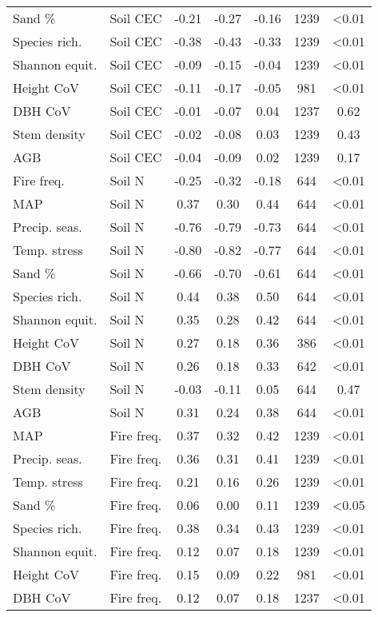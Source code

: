 \begin{longtable}{llS[table-format=-1.2]S[table-format=-1.2]S[table-format=-1.2]S[table-format=4.0]S[table-format=<1.2]}
Sand \% & Soil CEC & -0.21 & -0.27 & -0.16 & 1239 & <0.01 \\ 
Species rich. & Soil CEC & -0.38 & -0.43 & -0.33 & 1239 & <0.01 \\ 
Shannon equit. & Soil CEC & -0.09 & -0.15 & -0.04 & 1239 & <0.01 \\ 
Height CoV & Soil CEC & -0.11 & -0.17 & -0.05 & 981 & <0.01 \\ 
DBH CoV & Soil CEC & -0.01 & -0.07 & 0.04 & 1237 & 0.62 \\ 
Stem density & Soil CEC & -0.02 & -0.08 & 0.03 & 1239 & 0.43 \\ 
AGB & Soil CEC & -0.04 & -0.09 & 0.02 & 1239 & 0.17 \\ 
Fire freq. & Soil N & -0.25 & -0.32 & -0.18 & 644 & <0.01 \\ 
MAP & Soil N & 0.37 & 0.30 & 0.44 & 644 & <0.01 \\ 
Precip. seas. & Soil N & -0.76 & -0.79 & -0.73 & 644 & <0.01 \\ 
Temp. stress & Soil N & -0.80 & -0.82 & -0.77 & 644 & <0.01 \\ 
Sand \% & Soil N & -0.66 & -0.70 & -0.61 & 644 & <0.01 \\ 
Species rich. & Soil N & 0.44 & 0.38 & 0.50 & 644 & <0.01 \\ 
Shannon equit. & Soil N & 0.35 & 0.28 & 0.42 & 644 & <0.01 \\ 
Height CoV & Soil N & 0.27 & 0.18 & 0.36 & 386 & <0.01 \\ 
DBH CoV & Soil N & 0.26 & 0.18 & 0.33 & 642 & <0.01 \\ 
Stem density & Soil N & -0.03 & -0.11 & 0.05 & 644 & 0.47 \\ 
AGB & Soil N & 0.31 & 0.24 & 0.38 & 644 & <0.01 \\ 
MAP & Fire freq. & 0.37 & 0.32 & 0.42 & 1239 & <0.01 \\ 
Precip. seas. & Fire freq. & 0.36 & 0.31 & 0.41 & 1239 & <0.01 \\ 
Temp. stress & Fire freq. & 0.21 & 0.16 & 0.26 & 1239 & <0.01 \\ 
Sand \% & Fire freq. & 0.06 & 0.00 & 0.11 & 1239 & <0.05 \\ 
Species rich. & Fire freq. & 0.38 & 0.34 & 0.43 & 1239 & <0.01 \\ 
Shannon equit. & Fire freq. & 0.12 & 0.07 & 0.18 & 1239 & <0.01 \\ 
Height CoV & Fire freq. & 0.15 & 0.09 & 0.22 & 981 & <0.01 \\ 
DBH CoV & Fire freq. & 0.12 & 0.07 & 0.18 & 1237 & <0.01 \\ 

\end{longtable}

